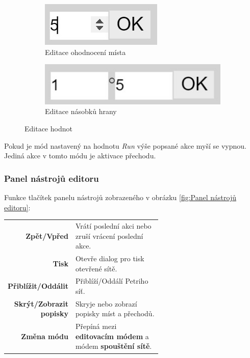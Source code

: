 \documentclass[
  biblatex,
  glossaries,
  printversion
]{kidiplom}
\begin{document}
\begin{figure}[h]
  \centering
  \begin{subfigure}[h]{0,4\linewidth}
    \includegraphics{dialog_place}
    \caption{Editace ohodnocení místa}
  \end{subfigure}
  \begin{subfigure}[h]{0,4\linewidth}
    \includegraphics[width=\linewidth]{dialog_arc}
    \caption{Editace násobků hrany}
  \end{subfigure}
  \caption{Editace hodnot}
  \label{fig:editace hodnot}
\end{figure}

Pokud je mód nastavený na hodnotu \textit{Run} výše popsané akce myší 
se vypnou. Jediná akce v tomto módu je aktivace přechodu.

\clearpage
\subsubsection{Panel nástrojů editoru}\label{panel nástrojů}

Funkce tlačítek panelu nástrojů zobrazeného v obrázku \ref{fig:Panel nástrojů editoru}:
\begin{center}
  \begin{tabular}{r p{0.6\linewidth}}
    \textbf{Zpět/Vpřed}          & Vrátí poslední akci nebo zruší vrácení poslední akce. \\
    \textbf{Tisk}                & Otevře dialog pro tisk otevřené sítě. \\
    \textbf{Přiblížit/Oddálit}   & Přiblíží/Oddálí Petriho síť. \\
    \textbf{Skrýt/Zobrazit popisky}  & Skryje nebo zobrazí popisky míst a přechodů. \\
    \textbf{Změna módu}  & Přepíná mezi \textbf{editovacím módem} a módem \textbf{spouštění sítě}. \\
  \end{tabular}
\end{center}
\end{document}
